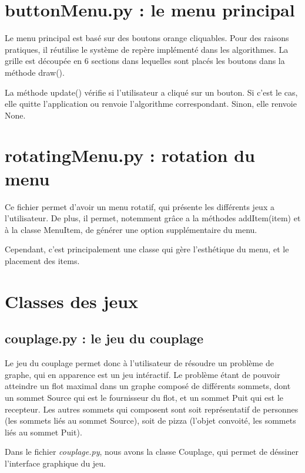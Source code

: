 \documentclass{scrreprt}
\begin{document}
\section{buttonMenu.py : le menu principal}

Le menu principal est basé sur des boutons orange cliquables. Pour des raisons pratiques,
 il réutilise le système de repère implémenté dans les algorithmes. La grille est découpée
 en 6 sections dans lequelles sont placés les boutons dans la méthode draw().

La méthode update() vérifie si l'utilisateur a cliqué sur un bouton. Si c'est le cas, elle
 quitte l'application ou renvoie l'algorithme correspondant. Sinon, elle renvoie None.

\section{rotatingMenu.py : rotation du menu}

Ce fichier permet d'avoir un menu rotatif, qui présente les différents jeux a l'utilisateur.
De plus, il permet, notemment grâce a la méthodes addItem(item) et à la classe MenuItem, de générer
 une option supplémentaire du menu.

Cependant, c'est principalement une classe qui gère l'esthétique du menu, et le placement des items.

\section{Classes des jeux}
	\subsection{couplage.py : le jeu du couplage}
	Le jeu du couplage permet donc à l'utilisateur de résoudre un problème de graphe, qui en apparence est
	 un jeu intéractif. Le problème étant de pouvoir atteindre un flot maximal dans un graphe composé de différents
	 sommets, dont un sommet Source qui est le fournisseur du flot, et un sommet Puit qui est le recepteur. Les autres sommets
	 qui composent sont soit représentatif de personnes (les sommets liés au sommet Source), soit de pizza (l'objet convoité, les 
	 sommets liés au sommet Puit).


	Dans le fichier \emph{couplage.py}, nous avons la classe Couplage, qui permet de déssiner l'interface graphique du jeu.
\end{document}
